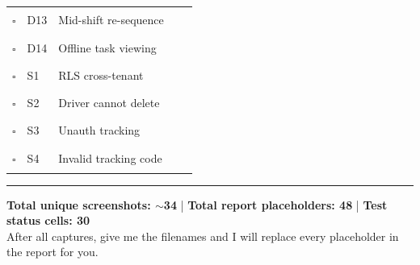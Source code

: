 \documentclass[11pt,a4paper]{article}
\newcommand{\checkbox}{$\square$\;}
\begin{document}
\begin{center}
\begin{longtable}{@{}p{0.4cm} p{1.2cm} p{4.5cm} p{1.5cm} p{4.5cm}@{}}
  \checkbox & D13 & Mid-shift re-sequence  & \rule{1.5cm}{0.4pt} & \\
  \checkbox & D14 & Offline task viewing   & \rule{1.5cm}{0.4pt} & \\
  \midrule
  \checkbox & S1  & RLS cross-tenant       & \rule{1.5cm}{0.4pt} & \\
  \checkbox & S2  & Driver cannot delete   & \rule{1.5cm}{0.4pt} & \\
  \checkbox & S3  & Unauth tracking        & \rule{1.5cm}{0.4pt} & \\
  \checkbox & S4  & Invalid tracking code  & \rule{1.5cm}{0.4pt} & \\
  \bottomrule
\end{longtable}
\end{center}

\vspace{12pt}
\noindent\rule{\textwidth}{0.8pt}
\begin{center}
  \textbf{Total unique screenshots: $\sim$34} \quad|\quad
  \textbf{Total report placeholders: 48} \quad|\quad
  \textbf{Test status cells: 30}\\[6pt]
  After all captures, give me the filenames and I will replace every placeholder in the report for you.
\end{center}
\end{document}
